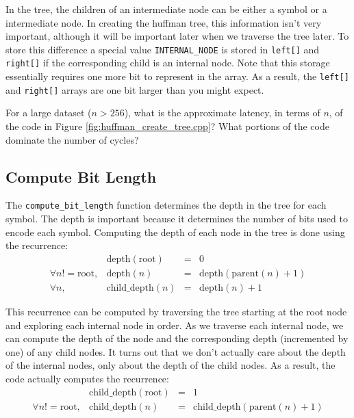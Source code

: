 In the tree, the children of an intermediate node can be either a symbol or a intermediate node.  In creating the huffman tree, this information isn't very important, although it will be important later when we traverse the tree later.  To store this difference
a special value \lstinline{INTERNAL_NODE} is stored in \lstinline{left[]} and \lstinline{right[]} if the corresponding child is an internal node.   Note that this storage essentially requires one more bit to represent in the array.  As a result, the \lstinline{left[]} and \lstinline{right[]} arrays are one bit larger than you might expect. 



\begin{exercise}
For a large dataset ($n > 256$), what is the approximate latency, in terms of $n$, of the code in Figure \ref{fig:huffman_create_tree.cpp}?  What portions of the code dominate the number of cycles?
\end{exercise}

\subsection{Compute Bit Length}

The \lstinline{compute_bit_length} function determines the depth in the tree for each symbol.  The depth is important because it determines the number of bits used to encode each symbol. Computing the depth of each node in the tree is done using the recurrence:
\begin{equation}
\begin{array}{rrcl}
&\mathrm{depth}(\mathrm{root}) &=& 0 \\
\forall n != \mathrm{root}, &\mathrm{depth}(n) &=& \mathrm{depth}(\mathrm{parent}(n)+1)\\
\forall n, &\mathrm{child\_depth}(n) &=& \mathrm{depth}(n)+1
\end{array}
\end{equation}

This recurrence can be computed by traversing the tree starting at the root node and exploring each internal node in order.  As we traverse each internal node, we can compute the depth of the node and the corresponding depth (incremented by one) of any child nodes.  It turns out that we don't actually care about the depth of the internal nodes, only about the depth of the child nodes.  As a result, the code actually computes the recurrence:
\begin{equation}
\begin{array}{rrcl}
&\mathrm{child\_depth}(\mathrm{root}) &=& 1 \\
\forall n != \mathrm{root}, &\mathrm{child\_depth}(n) &=& \mathrm{child\_depth}(\mathrm{parent}(n)+1)
\end{array}
\end{equation}

